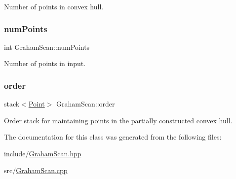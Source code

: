 Number of points in convex hull. 

\mbox{\label{classGrahamScan_a6d28337ba41b02338253a3ebbec09463}} 
\subsubsection{\texorpdfstring{num\+Points}{numPoints}}
{\footnotesize\ttfamily int Graham\+Scan\+::num\+Points\hspace{0.3cm}{\ttfamily [private]}}



Number of points in input. 

\mbox{\label{classGrahamScan_ab90660de0ce0be702da0760f37f7d797}} 
\subsubsection{\texorpdfstring{order}{order}}
{\footnotesize\ttfamily stack$<$\mbox{\hyperlink{classPoint}{Point}}$>$ Graham\+Scan\+::order\hspace{0.3cm}{\ttfamily [private]}}



Order stack for maintaining points in the partially constructed convex hull. 



The documentation for this class was generated from the following files\+:\begin{DoxyCompactItemize}
\item 
include/\mbox{\hyperlink{GrahamScan_8hpp}{Graham\+Scan.\+hpp}}\item 
src/\mbox{\hyperlink{GrahamScan_8cpp}{Graham\+Scan.\+cpp}}\end{DoxyCompactItemize}
